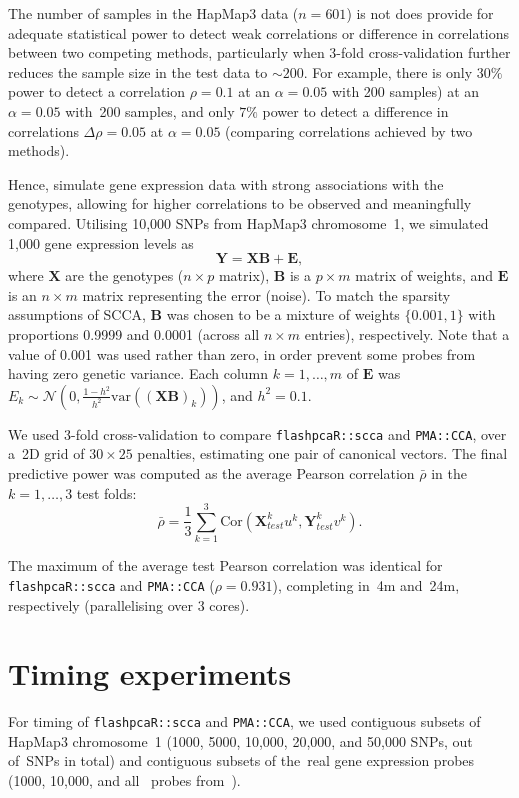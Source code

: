 \documentclass[a4paper,10pt]{article}
\begin{document}
The number of samples in the HapMap3 data ($n=601$) is not does provide
for adequate statistical power to detect weak correlations or difference
in correlations between two competing methods, particularly when 3-fold
cross-validation further reduces the sample size in the test data to
${\sim}200$. For example, there is only $30\%$ power to detect a correlation
$\rho=0.1$ at an $\alpha=0.05$ with 200 samples) at an $\alpha=0.05$ with~200
samples, and only $7\%$ power to detect a difference in correlations $\Delta
\rho=0.05$ at $\alpha=0.05$ (comparing correlations achieved by two methods).

Hence, simulate gene expression data with strong associations with the
genotypes, allowing for higher correlations to be observed and meaningfully
compared.  Utilising 10,000 SNPs from HapMap3 chromosome~1, we simulated 1,000 gene
expression levels as
$$
\mathbf{Y} = \mathbf{X} \mathbf{B} + \mathbf{E},
$$
where $\mathbf{X}$ are the genotypes ($n \times p$ matrix), $\mathbf{B}$
is a $p \times m$ matrix of weights, and $\mathbf{E}$ is an $n \times m$
matrix representing the error (noise). To match the sparsity assumptions
of SCCA, $\mathbf{B}$ was chosen to be a mixture of weights $\{0.001, 1\}$
with proportions 0.9999 and 0.0001 (across all $n \times m$ entries),
respectively.  Note that a value of 0.001 was used rather than zero, in
order prevent some probes from having zero genetic variance. Each column
$k=1,\hdots,m$ of $\mathbf{E}$ was $E_k \sim \mathcal{N}(0, \frac{1-h^2}{h^2}
\mbox{var}((\mathbf{X}\mathbf{B})_k))$, and $h^2=0.1$.

We used 3-fold cross-validation to compare \texttt{flashpcaR::scca} and
\texttt{PMA::CCA}, over a~2D grid of $30\times25$ penalties, estimating one
pair of canonical vectors. The final predictive power was computed as the
average Pearson correlation $\bar{\rho}$ in the~$k=1,\hdots,3$ test folds:
$$
\bar{\rho} = \frac{1}{3} \sum_{k=1}^3
   \mbox{Cor}(\mathbf{X}_{test}^k u^k, \mathbf{Y}_{test}^k v^k).
$$

The maximum of the average test Pearson correlation was identical for
\texttt{flashpcaR::scca} and \texttt{PMA::CCA} ($\rho{=}0.931$), completing
in~4m and~24m, respectively (parallelising over 3 cores).

\section{Timing experiments}

For timing of \texttt{flashpcaR::scca} and \texttt{PMA::CCA}, we used
contiguous subsets of HapMap3 chromosome~1 (1000, 5000, 10,000, 20,000,
and 50,000 SNPs, out of~\ngenes SNPs in total) and contiguous subsets of
the~\ngenes real gene expression probes (1000, 10,000, and all~\ngenes
probes from~\citep{Stranger2012}).
\end{document}
